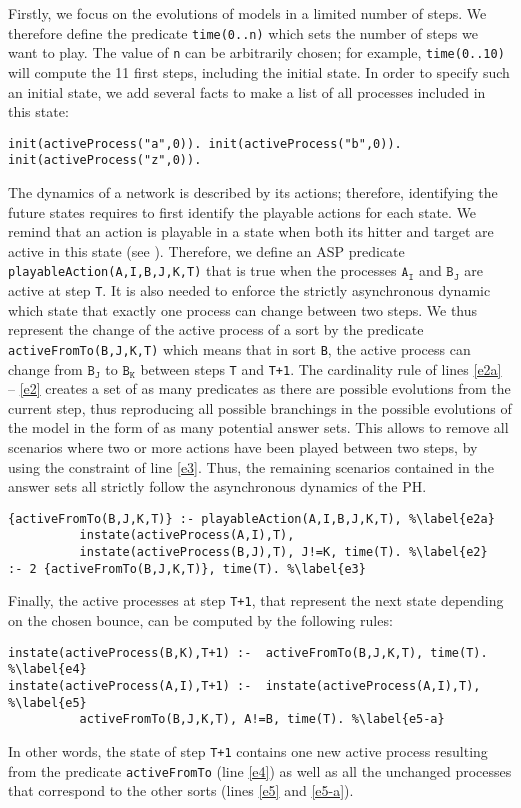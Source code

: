 Firstly, we focus on the evolutions of models in a limited number of steps.
We therefore define the predicate \texttt{time(0..n)} which sets the number of steps we want to play.
The value of \texttt{n} can be arbitrarily chosen;
for example, \texttt{time(0..10)} will compute the 11 first steps,
including the initial state.
In order to specify such an initial state, we add several facts
to make a list of all processes included in this state:
\begin{lstlisting}
init(activeProcess("a",0)). init(activeProcess("b",0)).
init(activeProcess("z",0)).
\end{lstlisting}
The dynamics of a network is described by its actions;
therefore, identifying the future states requires to first identify the playable actions for each state.
We remind that an action is playable in a state when both its hitter and target are active in this state (see ).
Therefore, we define an ASP predicate \texttt{playableAction(A,I,B,J,K,T)} that is true
when the processes $\texttt{A}_\texttt{I}$ and $\texttt{B}_\texttt{J}$ are active at step \texttt{T}.
It is also needed to enforce the strictly asynchronous dynamic
which state that exactly one process can change between two steps.
We thus represent the change of the active process of a sort
by the predicate \texttt{activeFromTo(B,J,K,T)}
which means that in sort \texttt{B}, the active process can change from $\texttt{B}_\texttt{J}$ to $\texttt{B}_\texttt{K}$ between steps \texttt{T} and \texttt{T+1}.
The cardinality rule of lines \ref{e2a} -- \ref{e2}
creates a set of as many predicates as there are possible evolutions from the current step,
thus reproducing all possible branchings in the possible evolutions of the model in the form of as many potential answer sets.
This allows to remove all scenarios where two or more actions have been played between
two steps, by using the constraint of line \ref{e3}.
Thus, the remaining scenarios contained in the answer sets all strictly follow
the asynchronous dynamics of the PH.
\begin{lstlisting}
{activeFromTo(B,J,K,T)} :- playableAction(A,I,B,J,K,T), %\label{e2a}
          instate(activeProcess(A,I),T),
          instate(activeProcess(B,J),T), J!=K, time(T). %\label{e2}
:- 2 {activeFromTo(B,J,K,T)}, time(T). %\label{e3}
\end{lstlisting}

Finally, the active processes at step \texttt{T+1},
that represent the next state depending on the chosen bounce,
can be computed by the following rules:
\begin{lstlisting}
instate(activeProcess(B,K),T+1) :-  activeFromTo(B,J,K,T), time(T). %\label{e4}
instate(activeProcess(A,I),T+1) :-  instate(activeProcess(A,I),T), %\label{e5}
          activeFromTo(B,J,K,T), A!=B, time(T). %\label{e5-a}
\end{lstlisting}
In other words, the state of step \texttt{T+1} contains one new active process
resulting from the predicate \texttt{activeFromTo} (line \ref{e4})
as well as all the unchanged processes that correspond to the other sorts (lines \ref{e5} and \ref{e5-a}).

